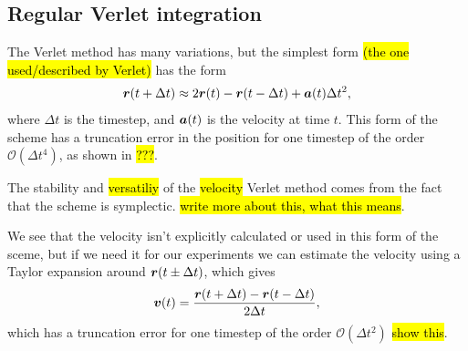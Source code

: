 
\subsection{Regular Verlet integration}
The Verlet method has many variations, but the simplest form \hl{(the one used/described by Verlet)} has the form
\begin{align}
    \boldsymbol{r}(t + \Delta t) \approx 2\boldsymbol{r}(t) - \boldsymbol{r}(t - \Delta t) + \boldsymbol{a}(t)\Delta t^2,
    \label{eq:regular_verlet}
\end{align}
where $\Delta t$ is the timestep, and $\boldsymbol{a}(t)$ is the velocity at time $t$. This form of the scheme has a truncation error in the position for one timestep of the order $\mathcal{O}(\Delta t^4)$, as shown in \hl{???}.

The stability and \hl{versatiliy} of the \hl{velocity} Verlet method comes from the fact that the scheme is symplectic. \hl{write more about this, what this means}.

We see that the velocity isn't explicitly calculated or used in this form of the sceme, but if we need it for our experiments we can estimate the velocity using a Taylor expansion around $\boldsymbol{r}(t\pm\Delta t)$, which gives
\begin{align*}
    \boldsymbol{v}(t) = \frac{\boldsymbol{r}(t + \Delta t) - \boldsymbol{r}(t - \Delta t)}{2\Delta t},
\end{align*}
which has a truncation error for one timestep of the order $\mathcal{O}(\Delta t^2)$ \hl{show this}. 

